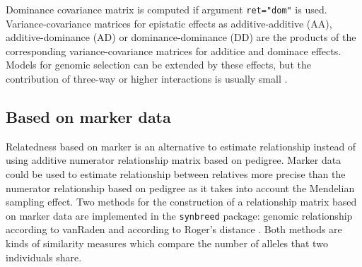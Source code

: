 \documentclass[a4paper,11pt]{article}
\begin{document}
Dominance covariance matrix is computed if argument \texttt{ret="dom"} is used. Variance-covariance matrices for epistatic effects as additive-additive (AA), additive-dominance (AD) or dominance-dominance (DD) are the products of the corresponding variance-covariance matrices for additice and dominace effects.                               
Models for genomic selection can be extended by these effects, but the contribution of three-way or higher interactions is usually small \citep{Bernardo2002}.  


\subsection{Based on marker data}

                 
Relatedness based on marker is an alternative to estimate relationship instead of using additive numerator relationship matrix based on pedigree. Marker data could be used to estimate relationship between relatives
more precise than the numerator relationship based on pedigree as it takes into account the Mendelian sampling effect. Two methods for the construction of a relationship matrix based on marker data are implemented in the \texttt{synbreed} package: genomic relationship according to vanRaden \citep{vanRaden2008} and according to Roger's distance  \citep{Rogers1972}.  Both methods are kinds of similarity measures which compare
the number of alleles that two individuals share.
\end{document}
